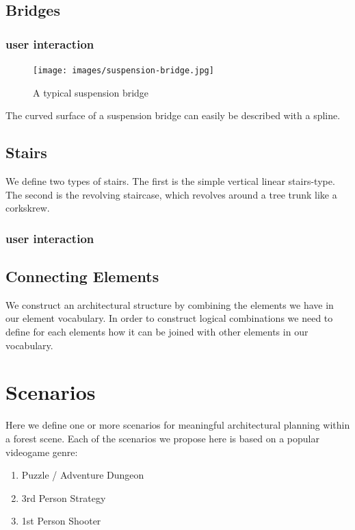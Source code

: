 \subsection{Bridges}
\label{sec:bridges}


\subsubsection{user interaction}


\begin{figure}[ht]
\centering
\texttt{[image: images/suspension-bridge.jpg]}
\label{fig:bridgeExample}
\caption{A typical suspension bridge}
\end{figure}
The curved surface of a suspension bridge can easily be described with a spline.   

\subsection{Stairs}
\label{sec:stairs}
  
We define two types of stairs. The first is the simple vertical linear stairs-type. The second is the revolving staircase, which revolves around a tree trunk like a corkskrew. 

\subsubsection{user interaction}

\subsection{Connecting Elements} 

We construct an architectural structure by combining the elements we have in our element vocabulary.
In order to construct logical combinations we need to define for each elements how it can be joined with other elements
in our vocabulary.

 
\section{Scenarios}
\label{sec:scenarios}

Here we define one or more scenarios for meaningful architectural planning within a forest scene. Each of the scenarios we propose here is based on a popular videogame genre: 

\begin{enumerate}
\item Puzzle / Adventure Dungeon
\item 3rd Person Strategy 
\item 1st Person Shooter
\end{enumerate} 

